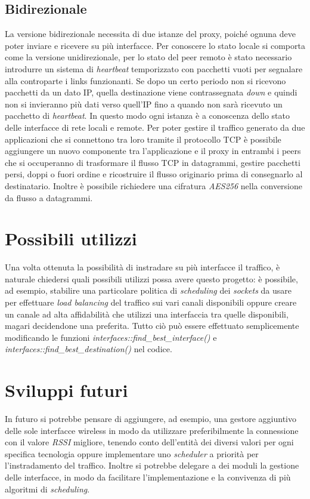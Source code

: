 \subsection{Bidirezionale}
La versione bidirezionale necessita di due istanze del proxy, poiché ognuna deve poter inviare e ricevere su più interfacce. Per conoscere lo stato locale si comporta come la versione unidirezionale, per lo stato del peer remoto è stato necessario introdurre un sistema di {\em heartbeat} temporizzato con pacchetti vuoti per segnalare alla controparte i links funzionanti. Se dopo un certo periodo non si ricevono pacchetti da un dato IP, quella destinazione viene contrassegnata {\em down} e quindi non si invieranno più dati verso quell'IP fino a quando non sarà ricevuto un pacchetto di {\em heartbeat}. In questo modo ogni istanza è a conoscenza dello stato delle interfacce di rete locali e remote. Per poter gestire il traffico generato da due applicazioni che si connettono tra loro tramite il protocollo TCP è possibile aggiungere un nuovo componente tra l'applicazione e il proxy in entrambi i peers che si occuperanno di trasformare il flusso TCP in datagrammi, gestire pacchetti persi, doppi o fuori ordine e ricostruire il flusso originario prima di consegnarlo al destinatario. Inoltre è possibile richiedere una cifratura {\em AES256} nella conversione da flusso a datagrammi.
\section{Possibili utilizzi}
Una volta ottenuta la possibilità di instradare su più interfacce il traffico, è naturale chiedersi quali possibili utilizzi possa avere questo progetto:
è possibile, ad esempio, stabilire una particolare politica di {\em scheduling} dei {\em sockets} da usare per effettuare {\em load balancing} del traffico sui vari canali disponibili oppure creare un canale ad alta affidabilità che utilizzi una interfaccia tra quelle disponibili, magari decidendone una preferita. Tutto ciò può essere effettuato semplicemente modificando le funzioni {\em interfaces::find\_best\_interface()} e {\em interfaces::find\_best\_destination()} nel codice.
\section{Sviluppi futuri}
In futuro si potrebbe pensare di aggiungere, ad esempio, una gestore aggiuntivo delle sole interfacce wireless in modo da utilizzare preferibilmente la connessione con il valore {\em RSSI} migliore, tenendo conto dell'entità dei diversi valori per ogni specifica tecnologia oppure implementare uno {\em scheduler} a priorità per l'instradamento del traffico. Inoltre si potrebbe delegare a dei moduli la gestione delle interfacce, in modo da facilitare l'implementazione e la convivenza di più algoritmi di {\em scheduling}.

